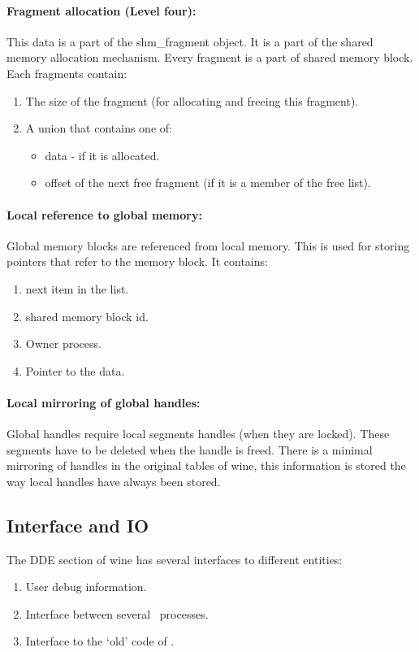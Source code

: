 \paragraph{Fragment allocation (Level four):}
This data is a part of the shm\_fragment object. It is a part of the shared
memory allocation mechanism. Every fragment is a part of shared memory
block. Each fragments contain:
\begin{enumerate}
  \item The size of the fragment (for allocating and freeing this
    fragment). 
  \item A union that contains one of:
    \begin{itemize}
      \item data - if it is allocated.
      \item offset of the next free fragment (if it is a member of the
        free list).
    \end{itemize}
\end{enumerate}


\paragraph{Local reference to global memory:}
Global memory blocks are referenced from local memory. This is used
for storing pointers that refer to the memory block. It contains:
\begin{enumerate}
  \item next item in the list.
  \item shared memory block id.
  \item Owner process.
  \item Pointer to the data.
\end{enumerate}

\paragraph{Local mirroring of global handles:}
Global handles require local segments handles (when they are locked).
These segments have to be deleted when the handle is freed.
There is a minimal mirroring of handles in the original tables of
wine, this information is stored the way local handles have always
been stored.

\subsection{Interface and IO}
The DDE section of wine has several interfaces to different entities:
\begin{enumerate}
  \item User debug information.
  \item Interface between several \Wine\ processes.
  \item Interface to the `old' code of \Wine.
\end{enumerate}


